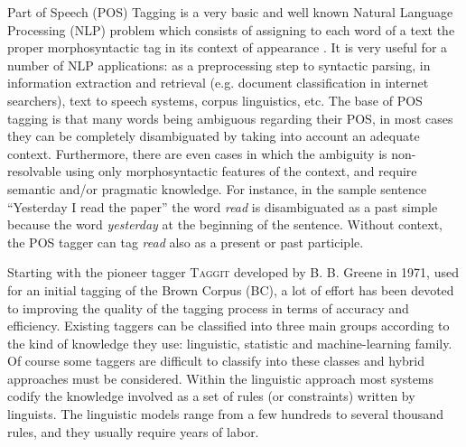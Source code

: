 Part of Speech (POS) Tagging is a very basic and well known Natural
Language Processing (NLP) problem which consists of assigning to each
word of a text the proper morphosyntactic tag in its context of
appearance \cite{marquez2000machine}. It is very useful for a number
of NLP applications: as a preprocessing step to syntactic parsing,
in information extraction and retrieval (e.g. document classification
in internet searchers), text to speech systems, corpus linguistics,
etc. The base of POS tagging is that many words being ambiguous
regarding their POS, in most cases they can be completely
disambiguated by taking into account an adequate context. Furthermore,
there are even cases in which the ambiguity is non-resolvable using
only morphosyntactic features of the context, and require semantic
and/or pragmatic knowledge. For instance, in the sample sentence
``Yesterday I read the paper'' the word \textit{read} is disambiguated
as a past simple because the word \textit{yesterday} at the beginning
of the sentence. Without context, the POS tagger can tag \textit{read}
also as a present or past participle.

Starting with the pioneer tagger \textsc{Taggit} developed by B. B.
Greene \etal{} in 1971, used for an initial tagging of the Brown
Corpus (BC), a lot of effort has been devoted to improving the quality
of the tagging process in terms of accuracy and efficiency. Existing
taggers can be classified into three main groups according to the kind
of knowledge they use: linguistic, statistic and machine-learning
family. Of course some taggers are difficult to classify into these
classes and hybrid approaches must be considered. Within the
linguistic approach most systems codify the knowledge involved as a
set of rules (or constraints) written by linguists. The linguistic
models range from a few hundreds to several thousand rules, and they
usually require years of labor.

